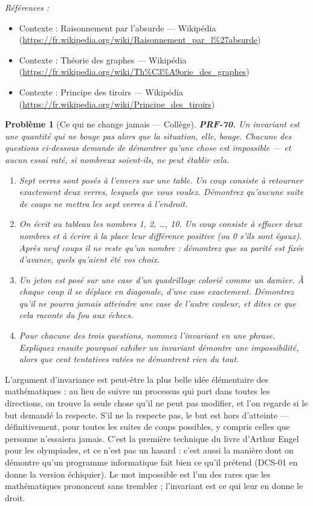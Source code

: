 \documentclass[11pt]{article}
\newtheorem{problem}{Problème}
\newenvironment{refs}{\par\small\noindent\emph{Références :}\begin{itemize}\setlength\itemsep{0pt}}{\end{itemize}\normalsize}
\begin{document}
\begin{refs}
\item Contexte : Raisonnement par l'absurde --- Wikipédia (\url{https://fr.wikipedia.org/wiki/Raisonnement_par_l%27absurde})
\item Contexte : Théorie des graphes --- Wikipédia (\url{https://fr.wikipedia.org/wiki/Th%C3%A9orie_des_graphes})
\item Contexte : Principe des tiroirs --- Wikipédia (\url{https://fr.wikipedia.org/wiki/Principe_des_tiroirs})
\end{refs}

\bigskip

\begin{problem}[{Ce qui ne change jamais --- Collège}]
\textbf{PRF-70.} Un invariant est une quantité qui ne bouge pas alors que la situation,
elle, bouge. Chacune des questions ci-dessous demande de démontrer qu'une chose est
\textit{impossible} --- et aucun essai raté, si nombreux soient-ils, ne peut établir cela.
\begin{enumerate}
\item[(a)] Sept verres sont posés à l'envers sur une table. Un coup consiste à retourner exactement
deux verres, lesquels que vous voulez. Démontrez qu'aucune suite de coups ne mettra les sept
verres à l'endroit.
\item[(b)] On écrit au tableau les nombres 1, 2, \dots{}, 10. Un coup consiste à effacer deux nombres et
à écrire à la place leur différence positive (ou 0 s'ils sont égaux). Après neuf coups il ne
reste qu'un nombre : démontrez que sa parité est fixée d'avance, quels qu'aient été vos
choix.
\item[(c)] Un jeton est posé sur une case d'un quadrillage colorié comme un damier. À chaque coup
il se déplace en diagonale, d'une case exactement. Démontrez qu'il ne pourra jamais atteindre
une case de l'autre couleur, et dites ce que cela raconte du fou aux échecs.
\item[(d)] Pour chacune des trois questions, nommez l'invariant en une phrase. Expliquez ensuite
pourquoi exhiber un invariant démontre une impossibilité, alors que cent tentatives ratées
ne démontrent rien du tout.
\end{enumerate}

\end{problem}

\noindent L'argument d'invariance est peut-être la plus belle idée élémentaire des
mathématiques : au lieu de suivre un processus qui part dans toutes les directions, on
trouve la seule chose qu'il ne peut pas modifier, et l'on regarde si le but demandé la
respecte. S'il ne la respecte pas, le but est hors d'atteinte --- définitivement, pour toutes
les suites de coups possibles, y compris celles que personne n'essaiera jamais. C'est la
première technique du livre d'Arthur Engel pour les olympiades, et ce n'est pas un hasard :
c'est aussi la manière dont on démontre qu'un programme informatique fait bien ce qu'il
prétend (DCS-01 en donne la version échiquier). Le mot \og{} impossible \fg{} est l'un des rares que
les mathématiques prononcent sans trembler ; l'invariant est ce qui leur en donne le
droit.
\end{document}
